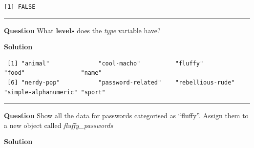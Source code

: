 \documentclass[]{book}
\newenvironment{Shaded}{\begin{snugshade}}{\end{snugshade}}
\newcommand{\CommentTok}[1]{\textcolor[rgb]{0.56,0.35,0.01}{\textit{#1}}}
\newcommand{\KeywordTok}[1]{\textcolor[rgb]{0.13,0.29,0.53}{\textbf{#1}}}
\newcommand{\NormalTok}[1]{#1}
\newcommand{\OperatorTok}[1]{\textcolor[rgb]{0.81,0.36,0.00}{\textbf{#1}}}
\newcommand{\StringTok}[1]{\textcolor[rgb]{0.31,0.60,0.02}{#1}}
\begin{document}
\begin{verbatim}
[1] FALSE
\end{verbatim}

\begin{Shaded}
\end{Shaded}

\begin{center}\rule{0.5\linewidth}{0.5pt}\end{center}

\textbf{Question }
What \textbf{levels} does the \emph{type} variable have?

\textbf{Solution }

\begin{Shaded}
\end{Shaded}

\begin{verbatim}
 [1] "animal"              "cool-macho"          "fluffy"              "food"                "name"               
 [6] "nerdy-pop"           "password-related"    "rebellious-rude"     "simple-alphanumeric" "sport"              
\end{verbatim}

\begin{center}\rule{0.5\linewidth}{0.5pt}\end{center}

\textbf{Question }
Show all the data for passwords categorised as ``fluffy''. Assign them to a new object called \emph{fluffy\_passwords}

\textbf{Solution }

\begin{Shaded}
\end{Shaded}
\end{document}
